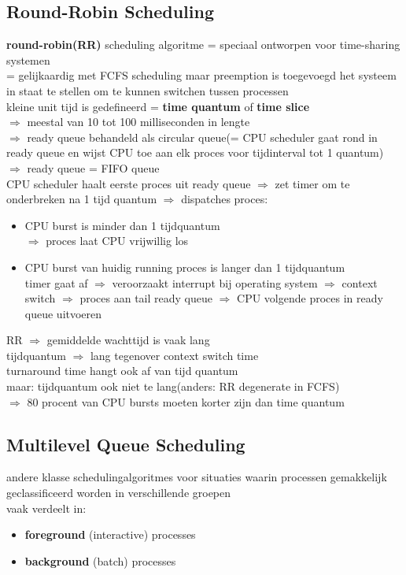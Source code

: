 \documentclass{report}
\begin{document}
\subsection{Round-Robin Scheduling}
\textbf{round-robin(RR)} scheduling algoritme = speciaal ontworpen voor time-sharing systemen
\\= gelijkaardig met FCFS scheduling maar preemption is toegevoegd het systeem in staat te stellen om te kunnen switchen tussen processen
\\kleine unit tijd is gedefineerd = \textbf{time quantum} of \textbf{time slice}
\\$\Rightarrow$ meestal van 10 tot 100 milliseconden in lengte
\\$\Rightarrow$ ready queue behandeld als circular queue(= CPU scheduler gaat rond in ready queue en wijst CPU toe aan elk proces voor tijdinterval tot 1 quantum)
\\$\Rightarrow$ ready queue = FIFO queue
\\CPU scheduler haalt eerste proces uit ready queue $\Rightarrow$ zet timer om te onderbreken na 1 tijd quantum $\Rightarrow$ dispatches proces:
\begin{itemize}
\item CPU burst is minder dan 1 tijdquantum
\\$\Rightarrow$ proces laat CPU vrijwillig los
\item CPU burst van huidig running proces is langer dan 1 tijdquantum
\\timer gaat af $\Rightarrow$ veroorzaakt interrupt bij operating system $\Rightarrow$ context switch $\Rightarrow$ proces aan tail ready queue $\Rightarrow$ CPU volgende proces in ready queue uitvoeren
\end{itemize}

RR $\Rightarrow$ gemiddelde wachttijd is vaak lang
\\tijdquantum $\Rightarrow$ lang tegenover context switch time
\\turnaround time hangt ook af van tijd quantum
\\maar: tijdquantum ook niet te lang(anders: RR degenerate in FCFS)
\\$\Rightarrow$ 80 procent van CPU bursts moeten korter zijn dan time quantum

\subsection{Multilevel Queue Scheduling}
andere klasse schedulingalgoritmes voor situaties waarin processen gemakkelijk geclassificeerd worden in verschillende groepen
\\vaak verdeelt in:
\begin{itemize}
\item \textbf{foreground} (interactive) processes
\item \textbf{background} (batch) processes
\end{itemize}
\end{document}

